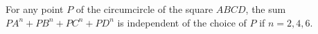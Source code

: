 For any point $P$ of the circumcircle of the square $ABCD$, the sum $PA^n + PB^n + PC^n + PD^n$ is independent of the choice of $P$ if $n = 2, 4, 6$.
